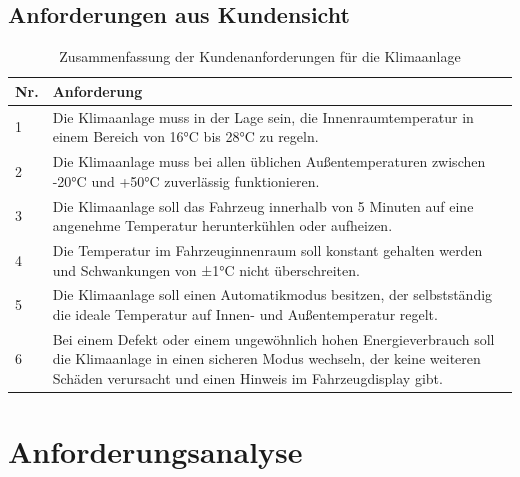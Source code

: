 \documentclass[a4paper,12pt]{article}
\begin{document}
	\newpage
	\subsection{Anforderungen aus Kundensicht}
	\begin{table}[h!]
		\centering
		\renewcommand{\arraystretch}{1.5} %
		\begin{tabular}{|p{1.5cm}|p{13cm}|}
			\hline
			\textbf{Nr.} & \textbf{Anforderung} \\
			\hline
			1 & Die Klimaanlage muss in der Lage sein, die Innenraumtemperatur in einem Bereich von 16°C bis 28°C zu regeln. \\
			\hline
			2 & Die Klimaanlage muss bei allen üblichen Außentemperaturen zwischen -20°C und +50°C zuverlässig funktionieren. \\
			\hline
			3 & Die Klimaanlage soll das Fahrzeug innerhalb von 5 Minuten auf eine angenehme Temperatur herunterkühlen oder aufheizen. \\
			\hline
			4 & Die Temperatur im Fahrzeuginnenraum soll konstant gehalten werden und Schwankungen von ±1°C nicht überschreiten. \\
			\hline
			5 & Die Klimaanlage soll einen Automatikmodus besitzen, der selbstständig die ideale Temperatur auf Innen- und Außentemperatur regelt. \\
			\hline
			6 & Bei einem Defekt oder einem ungewöhnlich hohen Energieverbrauch soll die Klimaanlage in einen sicheren Modus wechseln, der keine weiteren Schäden verursacht und einen Hinweis im Fahrzeugdisplay gibt. \\
			\hline
		\end{tabular}
		\caption{Zusammenfassung der Kundenanforderungen für die Klimaanlage}
		\label{tab:kundenanforderungen}
	\end{table}
	
	\section{Anforderungsanalyse}
\end{document}

